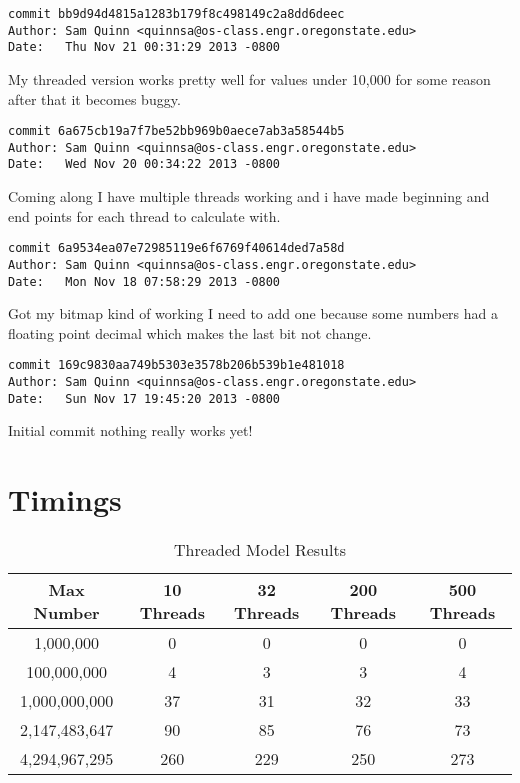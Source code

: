 \documentclass[letterpaper,10pt,notitlepage,fleqn]{article}
\begin{document}
\begin{verbatim}
commit bb9d94d4815a1283b179f8c498149c2a8dd6deec
Author: Sam Quinn <quinnsa@os-class.engr.oregonstate.edu>
Date:   Thu Nov 21 00:31:29 2013 -0800
\end{verbatim}
    My threaded version works pretty well for values under 10,000 for some reason after that it becomes buggy.

\begin{verbatim}
commit 6a675cb19a7f7be52bb969b0aece7ab3a58544b5
Author: Sam Quinn <quinnsa@os-class.engr.oregonstate.edu>
Date:   Wed Nov 20 00:34:22 2013 -0800
\end{verbatim}
    Coming along I have multiple threads working and i have made beginning and end points for each thread to calculate with.

\begin{verbatim}
commit 6a9534ea07e72985119e6f6769f40614ded7a58d
Author: Sam Quinn <quinnsa@os-class.engr.oregonstate.edu>
Date:   Mon Nov 18 07:58:29 2013 -0800
\end{verbatim}
    Got my bitmap kind of working I need to add one because some numbers had a floating point decimal which makes the last bit not change.

\begin{verbatim}
commit 169c9830aa749b5303e3578b206b539b1e481018
Author: Sam Quinn <quinnsa@os-class.engr.oregonstate.edu>
Date:   Sun Nov 17 19:45:20 2013 -0800
\end{verbatim}
    Initial commit nothing really works yet!


\section*{Timings}


\begin{table}[ht] 
\caption{Threaded Model Results} %
\centering %
\begin{tabular}{ c c c c c} %
\hline\hline %
Max Number & 10 Threads & 32 Threads & 200 Threads & 500 Threads\\ [0.5ex] %
\hline %
1,000,000 & 0 & 0 & 0 & 0 \\
100,000,000 & 4 & 3 & 3 & 4 \\ 
1,000,000,000 & 37 & 31 & 32 & 33 \\
2,147,483,647 & 90 & 85 & 76 & 73 \\ 
4,294,967,295 & 260 & 229 & 250 & 273 \\%
[1ex] %
\hline %
\end{tabular} 
\label{table:nonlin} %
\end{table} 
\end{document}
